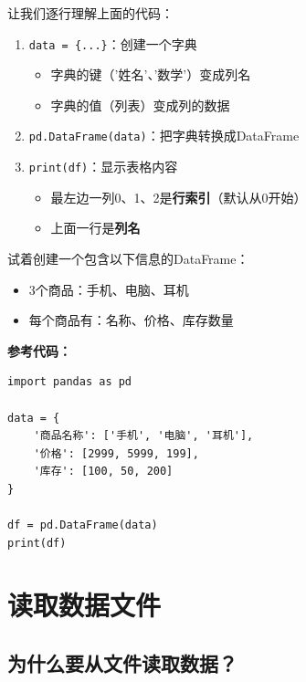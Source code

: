 \documentclass[12pt,a4paper]{article}
\begin{document}
\begin{knowledgebox}
让我们逐行理解上面的代码：

\begin{enumerate}
    \item \texttt{data = \{...\}}：创建一个字典
    \begin{itemize}
        \item 字典的键（'姓名'、'数学'）变成列名
        \item 字典的值（列表）变成列的数据
    \end{itemize}
    
    \item \texttt{pd.DataFrame(data)}：把字典转换成DataFrame
    
    \item \texttt{print(df)}：显示表格内容
    \begin{itemize}
        \item 最左边一列0、1、2是\textbf{行索引}（默认从0开始）
        \item 上面一行是\textbf{列名}
    \end{itemize}
\end{enumerate}
\end{knowledgebox}

\begin{practicebox}[动手练习1]
试着创建一个包含以下信息的DataFrame：
\begin{itemize}
    \item 3个商品：手机、电脑、耳机
    \item 每个商品有：名称、价格、库存数量
\end{itemize}

\textbf{参考代码：}
\begin{lstlisting}
import pandas as pd

data = {
    '商品名称': ['手机', '电脑', '耳机'],
    '价格': [2999, 5999, 199],
    '库存': [100, 50, 200]
}

df = pd.DataFrame(data)
print(df)
\end{lstlisting}
\end{practicebox}

\section{读取数据文件}

\subsection{为什么要从文件读取数据？}
\end{document}
